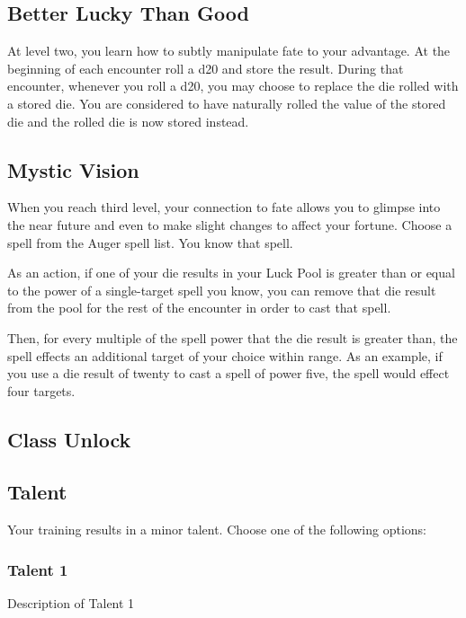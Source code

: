 \vspace{.1 in}

\subsection*{Better Lucky Than Good}
At level two, you learn how to subtly manipulate fate to your advantage. At the beginning of each encounter roll a d20 and store the result. During that encounter, whenever you roll a d20, you may choose to replace the die rolled with a stored die. You are considered to have naturally rolled the value of the stored die and the rolled die is now stored instead.

\vspace{.1 in}

\subsection*{Mystic Vision}
When you reach third level, your connection to fate allows you to glimpse into the near future and even to make slight changes to affect your fortune. Choose a spell from the Auger spell list. You know that spell.

As an action, if one of your die results in your Luck Pool is greater than or equal to the power of a single-target spell you know, you can remove that die result from the pool for the rest of the encounter in order to cast that spell. 

Then, for every multiple of the spell power that the die result is greater than, the spell effects an additional target of your choice within range. As an example, if you use a die result of twenty to cast a spell of power five, the spell would effect four targets.

\vspace{.1 in}

\subsection*{Class Unlock}
\lipsum[1]

\vspace{.1 in}

\subsection*{Talent}
Your training results in a minor talent. Choose one of the following options:

\subsubsection{Talent 1}
Description of Talent 1

